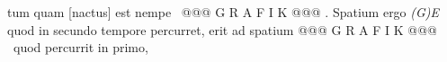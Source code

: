 {{                %
                     tum quam}{} [nactus] est  nempe \ @@@ G R A F I K @@@%
                    . Spatium ergo \textit{(G)E} quod in secundo tempore percurret, erit ad spatium @@@ G R A F I K @@@%
                     \ quod percurrit in primo, }
